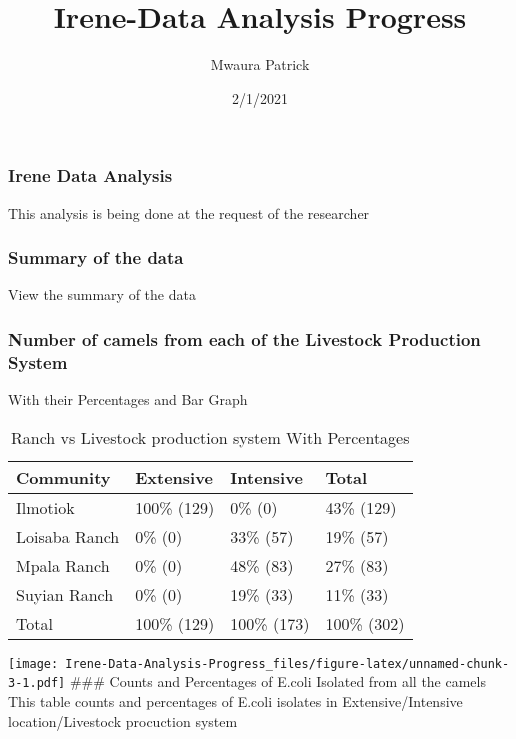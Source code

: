 \documentclass[
]{article}
\title{Irene-Data Analysis Progress}
\author{Mwaura Patrick}
\date{2/1/2021}
\begin{document}
\maketitle

\hypertarget{irene-data-analysis}{%
\subsubsection{Irene Data Analysis}\label{irene-data-analysis}}

This analysis is being done at the request of the researcher

\hypertarget{summary-of-the-data}{%
\subsubsection{Summary of the data}\label{summary-of-the-data}}

View the summary of the data

\hypertarget{number-of-camels-from-each-of-the-livestock-production-system}{%
\subsubsection{Number of camels from each of the Livestock Production
System}\label{number-of-camels-from-each-of-the-livestock-production-system}}

With their Percentages and Bar Graph

\begin{table}

\caption{\label{tab:unnamed-chunk-3}Ranch vs Livestock production system With Percentages}
\centering
\begin{tabular}[t]{l|l|l|l}
\hline
Community & Extensive & Intensive & Total\\
\hline
Ilmotiok & 100\% (129) & 0\%   (0) & 43\% (129)\\
\hline
Loisaba Ranch & 0\%   (0) & 33\%  (57) & 19\%  (57)\\
\hline
Mpala Ranch & 0\%   (0) & 48\%  (83) & 27\%  (83)\\
\hline
Suyian Ranch & 0\%   (0) & 19\%  (33) & 11\%  (33)\\
\hline
Total & 100\% (129) & 100\% (173) & 100\% (302)\\
\hline
\end{tabular}
\end{table}

\texttt{[image: Irene-Data-Analysis-Progress\_files/figure-latex/unnamed-chunk-3-1.pdf]}
\#\#\# Counts and Percentages of E.coli Isolated from all the camels
This table counts and percentages of E.coli isolates in
Extensive/Intensive location/Livestock procuction system
\end{document}
